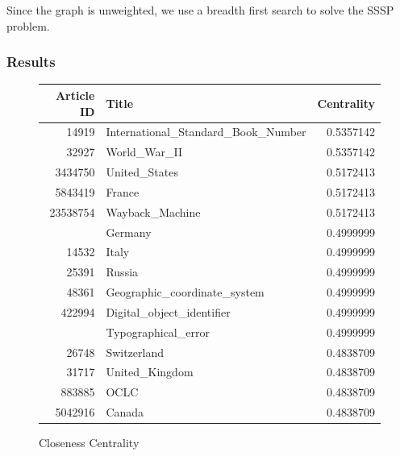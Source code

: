 \documentclass{article}
\begin{document}
Since the graph is unweighted, we use a breadth first search to solve the SSSP problem.

\subsubsection*{Results}





\begin{figure}[H]
    \caption[fig]{Closeness Centrality}
    \centering
    \begin{tabular}{rlr}
        \toprule
        Article ID & Title & Centrality \\
        \midrule
        14919 & International\_Standard\_Book\_Number & 0.5357142\\
        32927 & World\_War\_II & 0.5357142\\
        3434750 & United\_States & 0.5172413\\
        5843419 & France & 0.5172413\\
        23538754 & Wayback\_Machine & 0.5172413\\
        \addlinespace
        11867 & Germany & 0.4999999\\
        14532 & Italy & 0.4999999\\
        25391 & Russia & 0.4999999\\
        48361 & Geographic\_coordinate\_system & 0.4999999\\
        422994 & Digital\_object\_identifier & 0.4999999\\
        \addlinespace
        1057428 & Typographical\_error & 0.4999999\\
        26748 & Switzerland & 0.4838709\\
        31717 & United\_Kingdom & 0.4838709\\
        883885 & OCLC & 0.4838709\\
        5042916 & Canada & 0.4838709\\
    \bottomrule
\end{tabular}
\end{figure}
\end{document}
